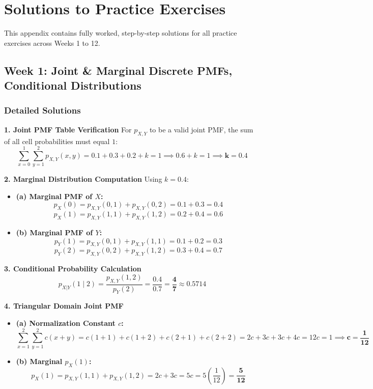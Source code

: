 \appendix
\chapter{Solutions to Practice Exercises}

This appendix contains fully worked, step-by-step solutions for all practice exercises across Weeks 1 to 12.

\section*{Week 1: Joint \& Marginal Discrete PMFs, Conditional Distributions}

\subsection*{Detailed Solutions}

\textbf{1. Joint PMF Table Verification}
For $p_{X,Y}$ to be a valid joint PMF, the sum of all cell probabilities must equal $1$:
$$\sum_{x=0}^1 \sum_{y=1}^2 p_{X,Y}(x, y) = 0.1 + 0.3 + 0.2 + k = 1 \implies 0.6 + k = 1 \implies \mathbf{k = 0.4}$$

\textbf{2. Marginal Distribution Computation}
Using $k = 0.4$:
\begin{itemize}
    \item \textbf{(a) Marginal PMF of $X$:}
    $$p_X(0) = p_{X,Y}(0, 1) + p_{X,Y}(0, 2) = 0.1 + 0.3 = \mathbf{0.4}$$
    $$p_X(1) = p_{X,Y}(1, 1) + p_{X,Y}(1, 2) = 0.2 + 0.4 = \mathbf{0.6}$$
    \item \textbf{(b) Marginal PMF of $Y$:}
    $$p_Y(1) = p_{X,Y}(0, 1) + p_{X,Y}(1, 1) = 0.1 + 0.2 = \mathbf{0.3}$$
    $$p_Y(2) = p_{X,Y}(0, 2) + p_{X,Y}(1, 2) = 0.3 + 0.4 = \mathbf{0.7}$$
\end{itemize}

\textbf{3. Conditional Probability Calculation}
$$p_{X|Y}(1 \mid 2) = \frac{p_{X,Y}(1, 2)}{p_Y(2)} = \frac{0.4}{0.7} = \mathbf{\frac{4}{7} \approx 0.5714}$$

\textbf{4. Triangular Domain Joint PMF}
\begin{itemize}
    \item \textbf{(a) Normalization Constant $c$:}
    $$\sum_{x=1}^2 \sum_{y=1}^2 c(x+y) = c(1+1) + c(1+2) + c(2+1) + c(2+2) = 2c + 3c + 3c + 4c = 12c = 1 \implies \mathbf{c = \frac{1}{12}}$$
    \item \textbf{(b) Marginal $p_X(1)$:}
    $$p_X(1) = p_{X,Y}(1, 1) + p_{X,Y}(1, 2) = 2c + 3c = 5c = 5\left(\frac{1}{12}\right) = \mathbf{\frac{5}{12}}$$
\end{itemize}

